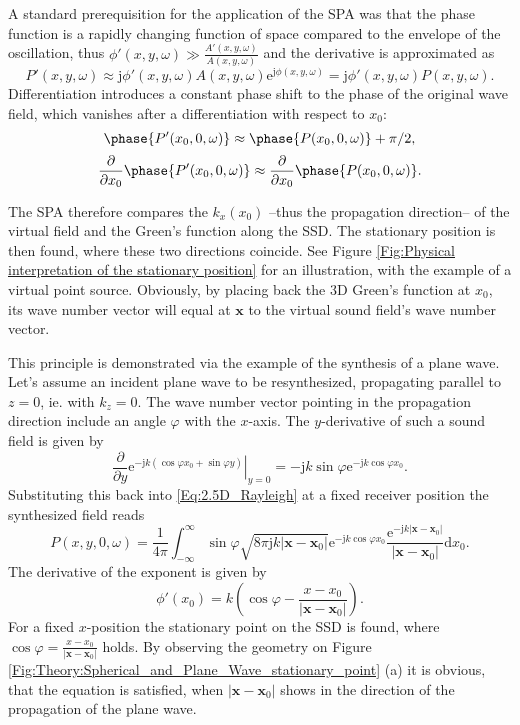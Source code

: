 \documentclass[12pt,a4paper]{article}
\newcommand{\td}{\mathrm{d}}
\newcommand{\te}{\mathrm{e}}
\newcommand{\ti}{\mathrm{j}}
\newcommand{\sinfi}{\sin\varphi}
\newcommand{\cosfi}{\cos\varphi}
\newcommand{\vx}{\mathbf{x}}
\newcommand{\vxo}{\mathbf{x}_0}
\begin{document}
A standard prerequisition for the application of the SPA was that the phase function is a rapidly changing function of space compared to the envelope of the oscillation, thus $\phi'(x,y,\omega) \gg \frac{A'(x,y,\omega)}{A(x,y,\omega)}$ and the derivative is approximated as
\begin{equation}
P'(x,y,\omega) \approx \ti \phi'(x,y,\omega) A(x,y,\omega)\te^{\ti \phi(x,y,\omega)} = \ti \phi'(x,y,\omega) P(x,y,\omega).
\end{equation}
Differentiation introduces a constant phase shift to the phase of the original wave field, which vanishes after a differentiation with respect to $x_0$:
\begin{equation}
\phase{ P'(x_0,0,\omega) } \approx \phase{ P(x_0,0,\omega) } + \pi/2,
\end{equation}
\begin{equation}
\frac{ \partial }{\partial x_0} \phase{ P'(x_0,0,\omega) } \approx  \frac{ \partial }{\partial x_0}\phase{ P(x_0,0,\omega) }.
\end{equation}

The SPA therefore compares the $k_x(x_0)$ --thus the propagation direction-- of the virtual field and the Green's function along the SSD. The stationary position is then found, where these two directions coincide. See Figure \ref{Fig:Physical interpretation of the stationary position} for an illustration, with the example of a virtual point source. Obviously, by placing back the 3D Green's function at $x_0$, its wave number vector will equal at $\vx$ to the virtual sound field's wave number vector. 

\vspace{3mm}
This principle is demonstrated via the example of the synthesis of a plane wave. Let's assume an incident plane wave to be resynthesized, propagating parallel to $z=0$, ie. with $k_z = 0$. The wave number vector pointing in the propagation direction include an angle $\varphi$ with the $x$-axis. The $y$-derivative of such a sound field is given by
\begin{equation}
\frac{\partial}{\partial y} \left. \te^{-\ti k ( \cosfi x_0 + \sinfi y )} \right|_{ y = 0 } = -\ti k \sinfi \te^{-\ti k \cosfi x_0}.
\end{equation}
Substituting this back into \eqref{Eq:2.5D_Rayleigh} at a fixed receiver position the synthesized field reads
\begin{equation}
P(x,y,0,\omega) = \frac{1}{4\pi}
 \int_{-\infty}^{\infty} \sinfi \sqrt{8\pi \ti k |\vx-\vxo|} \te^{-\ti k \cosfi x_0} \frac{\te^{-\ti k |\vx - \vxo|}}{|\vx - \vxo|} \td x_0.
\end{equation}
The derivative of the exponent is given by
\begin{equation}
\phi'(x_0) = k \left( \cosfi - \frac{x-x_0}{|\vx - \vxo|} \right).
\end{equation}
For a fixed $x$-position the stationary point on the SSD is found, where $\cosfi = \frac{x-x_0}{|\vx-\vxo|}$ holds. By observing the geometry on Figure \ref{Fig:Theory:Spherical_and_Plane_Wave_stationary_point} (a) it is obvious, that the equation is satisfied, when $|\vx-\vxo|$ shows in the direction of the propagation of the plane wave.
\end{document}
